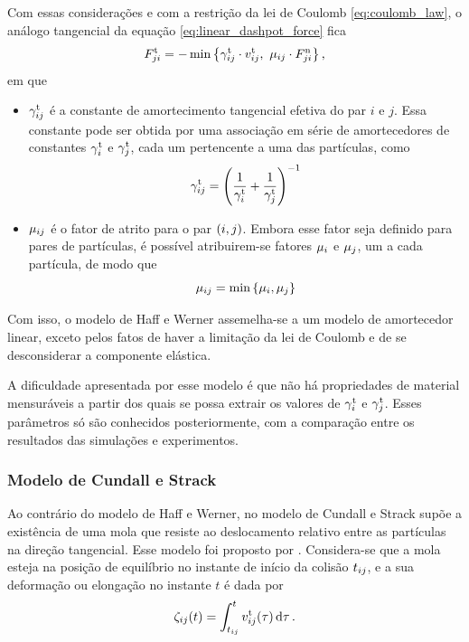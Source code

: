 Com essas considerações e com a restrição da lei de Coulomb \eqref{eq:coulomb_law}, o análogo tangencial da equação \eqref{eq:linear_dashpot_force} fica
\begin{equation*}
	{F}_{j i}^{\text{t}} = - \min\left\lbrace {\gamma}_{i j}^{\text{t}}\cdot{v}_{i j}^{\text{t}},\,\, {\mu}_{i j}\cdot{F}_{j i}^{\text{n}} \right\rbrace,
\end{equation*}
em que
\begin{itemize}
	\item \({\gamma}_{i j}^{\text{t}}\) é a constante de amortecimento tangencial efetiva do par \(i\) e \(j\). Essa constante pode ser obtida por uma associação em série de amortecedores de constantes \({\gamma}_{i}^{\text{t}}\) e \({\gamma}_{j}^{\text{t}}\), cada um pertencente a uma das partículas, como
	\begin{equation*}
		\tangentialDampingConstantij = \pqty{\dfrac{1}{\tangentialDampingConstanti} + \dfrac{1}{\tangentialDampingConstantj}}^{-1}
	\end{equation*}

	\item \({\mu}_{i j}\) é o fator de atrito para o par \(\pqty{i,j}\). Embora esse fator seja definido para pares de partículas, é possível atribuirem-se fatores \({\mu}_{i}\) e \({\mu}_{j}\), um a cada partícula, de modo que
	\begin{equation*}
		\dynamicFrictionij = \min\Bqty{\dynamicFrictioni, \dynamicFrictionj}
	\end{equation*}
\end{itemize}

Com isso, o modelo de Haff e Werner assemelha-se a um modelo de amortecedor linear, exceto pelos fatos de haver a limitação da lei de Coulomb e de se desconsiderar a componente elástica.

A dificuldade apresentada por esse modelo é que não há propriedades de material mensuráveis a partir dos quais se possa extrair os valores de \({\gamma}_{i}^{\text{t}}\) e \({\gamma}_{j}^{\text{t}}\). Esses parâmetros só são conhecidos posteriormente, com a comparação entre os resultados das simulações e experimentos.

\subsubsection*{Modelo de Cundall e Strack}

Ao contrário do modelo de Haff e Werner, no modelo de Cundall e Strack supõe a existência de uma mola que resiste ao deslocamento relativo entre as partículas na direção tangencial. Esse modelo foi proposto por . Considera-se que a mola esteja na posição de equilíbrio no instante de início da colisão \({t}_{i j}\), e a sua deformação ou elongação no instante \(t\) é dada por
\begin{equation*}
	\elongationij\pqty{t} = \int_{\collisionBeginningij}^{t} \relativeTangentialVelocityScalarij\pqty{\tau} \dd{\tau}.
\end{equation*}

